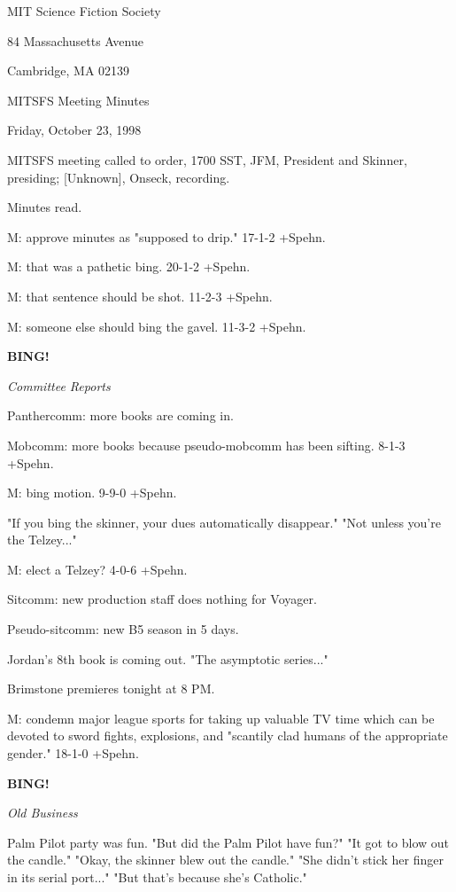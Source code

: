 \documentclass[12pt]{article}
\newcommand{\bing}{{\bf BING!} }
\newcommand{\goto}[1]{\bing \vskip 12pt \centerline{{\em{#1}}}}
\begin{document}
\begin{center}

MIT Science Fiction Society 

84 Massachusetts Avenue

Cambridge, MA 02139

\vspace{12pt}

MITSFS Meeting Minutes 

Friday, October 23, 1998

\end{center}
 
\vspace{18pt}

\setlength{\parskip}{6pt}

\noindent
MITSFS meeting called to order, 1700 SST,
JFM, President and Skinner, presiding; [Unknown], Onseck, recording.

Minutes read.

M: approve minutes as "supposed to drip." 17-1-2 +Spehn.

M: that was a pathetic bing. 20-1-2 +Spehn.

M: that sentence should be shot. 11-2-3 +Spehn.

M: someone else should bing the gavel. 11-3-2 +Spehn.

\goto{Committee Reports}

Panthercomm: more books are coming in.

Mobcomm: more books because pseudo-mobcomm has been sifting. 8-1-3 +Spehn.

M: bing motion. 9-9-0 +Spehn.

"If you bing the skinner, your dues automatically disappear." "Not unless you're the Telzey..."

M: elect a Telzey? 4-0-6 +Spehn.

Sitcomm: new production staff does nothing for Voyager.

Pseudo-sitcomm: new B5 season in 5 days.

Jordan's 8th book is coming out. "The asymptotic series..."

Brimstone premieres tonight at 8 PM.

M: condemn major league sports for taking up valuable TV time which can be devoted to sword fights, explosions, and "scantily clad humans of the appropriate gender." 18-1-0 +Spehn.

\goto{Old Business}

Palm Pilot party was fun. "But did the Palm Pilot have fun?" "It got to blow out the candle." "Okay, the skinner blew out the candle." "She didn't stick her finger in its serial port..." "But that's because she's Catholic."
\end{document}
